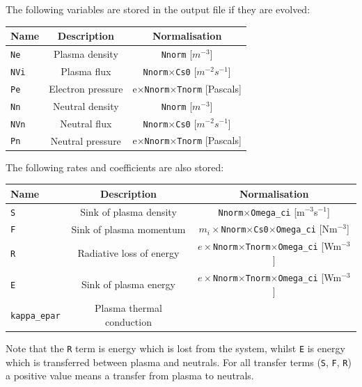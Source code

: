 \documentclass[12pt,a4paper]{article}
\begin{document}
\noindent The following variables are stored in the output file if they are evolved:

\begin{center}
\begin{tabular}{l c c}
  Name & Description & Normalisation \\
  \hline
  \texttt{Ne}  & Plasma density  & \texttt{Nnorm} [$m^{-3}$]\\
  \texttt{NVi} & Plasma flux  & \texttt{Nnorm}$\times$\texttt{Cs0} [$m^{-2}s^{-1}$]\\
  \texttt{Pe}   & Electron pressure & e$\times$\texttt{Nnorm}$\times$\texttt{Tnorm} [Pascals] \\
  \texttt{Nn}  & Neutral density & \texttt{Nnorm} [$m^{-3}$] \\
  \texttt{NVn} & Neutral flux  & \texttt{Nnorm}$\times$\texttt{Cs0} [$m^{-2}s^{-1}$]\\
  \texttt{Pn}  & Neutral pressure & e$\times$\texttt{Nnorm}$\times$\texttt{Tnorm} [Pascals] \\
  \hline
\end{tabular}
\end{center}

\noindent The following rates and coefficients are also stored:
\begin{center}
\begin{tabular}{l c c}
  Name & Description & Normalisation \\
  \hline
  \texttt{S} & Sink of plasma density & \texttt{Nnorm}$\times$\texttt{Omega\_ci} [m$^{-3}$s$^{-1}$] \\
  \texttt{F} & Sink of plasma momentum & $m_i\times$\texttt{Nnorm}$\times$\texttt{Cs0}$\times$\texttt{Omega\_ci} [Nm$^{-3}$] \\
  \texttt{R} & Radiative loss of energy & $e\times$\texttt{Nnorm}$\times$\texttt{Tnorm}$\times$\texttt{Omega\_ci} [Wm$^{-3}$] \\
  \texttt{E} & Sink of plasma energy & $e\times$\texttt{Nnorm}$\times$\texttt{Tnorm}$\times$\texttt{Omega\_ci} [Wm$^{-3}$] \\
  \texttt{kappa\_epar} & Plasma thermal conduction & \\ 
  \hline
\end{tabular}
\end{center}
Note that the \texttt{R} term is energy which is lost from the system, whilst \texttt{E} is energy which is
transferred between plasma and neutrals. For all transfer terms (\texttt{S}, \texttt{F}, \texttt{R}) a positive value means
a transfer from plasma to neutrals.
\end{document}

